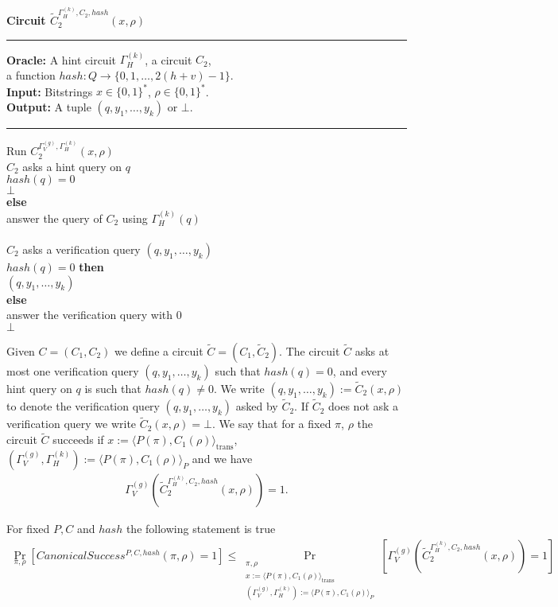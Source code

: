 %
\begin{codeblock}
  \textbf{Circuit $\widetilde{C}_2^{\Gamma_H^{(k)}, C_2, hash} (x, \rho)$}
  \medskip \hrule \medskip
  \textbf{Oracle:} A hint circuit $\Gamma_H^{(k)}$, a circuit $C_2$, \\
  \IndII a function $hash : Q \rightarrow \{0,1,\dots, 2(h+v)-1\}$. \\
  \textbf{Input:} Bitstrings $x \in \{0,1\}^{*}$, $\rho \in \{0,1\}^{*}$. \\
  \textbf{Output:} A tuple $(q, y_1, \dots, y_k)$ or $\bot$.
  \medskip\hrule\medskip
  Run $C_2^{\Gamma_V^{(g)},\Gamma_H^{(k)}}(x, \rho)$ \\
  \IndI \If $C_2$ asks a hint query on $q$ \then\\
  \IndII \If $hash(q) = 0$ \then\\
  \IndIII \return $\bot$\\
  \IndII \textbf{else}\\
  \IndIII answer the query of $C_2$ using $\Gamma_H^{(k)}(q)$\\
  \\
  \IndI \If $C_2$ asks a verification query $(q, y_1, \dots, y_k)$ \then \\
  \IndII \If $hash(q) = 0 $ \textbf{then} \\
  \IndIII \return $(q, y_1, \dots, y_k)$ \\
  \IndII \textbf{else} \\
  \IndIII answer the verification query with 0 \\
  \return $\bot$
\end{codeblock}
%
Given $C = (C_1, C_2)$ we define a circuit $\widetilde{C} = (C_1, \widetilde{C}_2)$.
The circuit $\widetilde{C}$ asks at most one verification query $(q, y_1, \dots, y_k)$
such that $hash(q) = 0$, and every hint query on $q$ is such that $hash(q) \neq 0$.
We write $(q, y_1, \dots, y_k) := \widetilde{C}_2(x, \rho)$ to denote
the verification query $(q, y_1, \dots, y_k)$ asked by $\widetilde{C}_2$.
If $\widetilde{C}_2$ does not ask a verification query we write $\widetilde{C}_2(x, \rho) = \bot $.
We say that for a fixed $\pi$, $\rho$ the circuit $\widetilde{C}$ succeeds if
$x := \langle P(\pi), C_1(\rho) \rangle_{\text{trans}}$,
$(\Gamma_V^{(g)}, \Gamma_H^{(k)}) := \langle P(\pi), C_1(\rho) \rangle_{P}$
and we have
\begin{align*}
\Gamma_V^{(g)}(\widetilde{C}_2^{\Gamma_H^{(k)}, C_2, hash}(x, \rho)) = 1.
\end{align*}
%
\begin{lemma}
  \label{lemma:ctilda_c}
  For fixed $P, C$ and $hash$ the following statement is true
  \begin{align*}
    \underset{\pi, \rho}{\Pr}[CanonicalSuccess^{P, C, hash}(\pi, \rho) = 1]
    \leq
    \underset{\substack{\pi, \rho \\
        x := \langle P(\pi), C_1(\rho) \rangle_{\text{trans}} \\
        (\Gamma_V^{(g)}, \Gamma_H^{(k)}) := \langle P(\pi), C_1(\rho) \rangle_{P}
      }}
    {\Pr}[\Gamma_V^{(g)}(\widetilde{C}_2^{\Gamma_H^{(k)}, C_2, hash}(x, \rho)) = 1]
  \end{align*}
\end{lemma}
